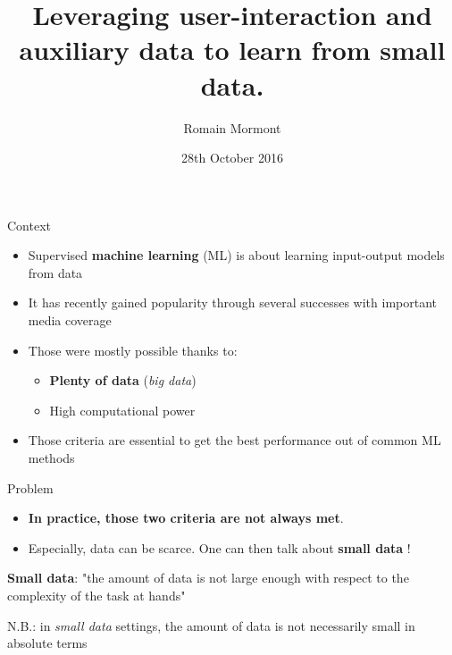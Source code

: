 \documentclass{beamer}
\title{{\bf Leveraging user-interaction and auxiliary data to learn from small data.}}
\author{Romain Mormont}
\institute{Systems and modeling unit, \\
Department of EE \& CS, \\ University of Liège, Belgium}
\date{28th October 2016}
\begin{document}
\renewcommand{\inserttotalframenumber}{11}


\begin{frame}
\titlepage
\end{frame}


\begin{frame}{Context}
	\begin{itemize}
		\item Supervised \textbf{machine learning} (ML) is about learning input-output models from data 
		\item It has recently gained popularity through several successes with important media coverage
		\item Those were mostly possible thanks to: 
		\begin{itemize}
			\item \textbf{Plenty of data} (\textit{big data})
			\item High computational power
		\end{itemize}
		\item Those criteria are essential to get the best performance out of common ML methods
	\end{itemize}
\end{frame}

\begin{frame}{Problem}
	\begin{itemize}
		\item \textbf{In practice, those two criteria are not always met}.
		\item Especially, data can be scarce. One can then talk about \textbf{small data} ! 
	\end{itemize}
	\vfill
	\begin{center}
		\large
		\textbf{Small data}: "the amount of data is not large enough with respect to the complexity of the task at hands" 
	\end{center}
	\vfill
	\begin{center}
		\small
		N.B.: in \textit{small data} settings, the amount of data is not necessarily small in absolute terms 
	\end{center}
\end{frame}
\end{document}
